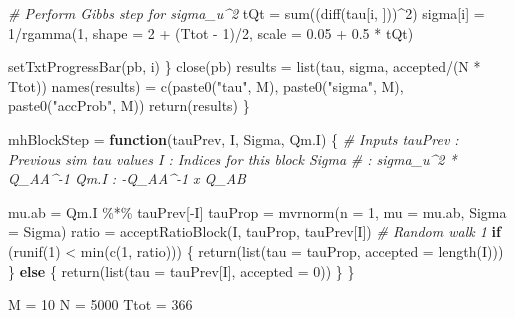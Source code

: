 \documentclass[
]{article}
\newenvironment{Shaded}{\begin{snugshade}}{\end{snugshade}}
\newcommand{\AttributeTok}[1]{\textcolor[rgb]{0.77,0.63,0.00}{#1}}
\newcommand{\CommentTok}[1]{\textcolor[rgb]{0.56,0.35,0.01}{\textit{#1}}}
\newcommand{\ControlFlowTok}[1]{\textcolor[rgb]{0.13,0.29,0.53}{\textbf{#1}}}
\newcommand{\DecValTok}[1]{\textcolor[rgb]{0.00,0.00,0.81}{#1}}
\newcommand{\FloatTok}[1]{\textcolor[rgb]{0.00,0.00,0.81}{#1}}
\newcommand{\FunctionTok}[1]{\textcolor[rgb]{0.00,0.00,0.00}{#1}}
\newcommand{\NormalTok}[1]{#1}
\newcommand{\OtherTok}[1]{\textcolor[rgb]{0.56,0.35,0.01}{#1}}
\newcommand{\SpecialCharTok}[1]{\textcolor[rgb]{0.00,0.00,0.00}{#1}}
\newcommand{\StringTok}[1]{\textcolor[rgb]{0.31,0.60,0.02}{#1}}
\begin{document}
\begin{Shaded}
\begin{Highlighting}[]
        \CommentTok{\# Perform Gibbs step for sigma\_u\^{}2}
\NormalTok{        tQt }\OtherTok{=} \FunctionTok{sum}\NormalTok{((}\FunctionTok{diff}\NormalTok{(tau[i, ]))}\SpecialCharTok{\^{}}\DecValTok{2}\NormalTok{)}
\NormalTok{        sigma[i] }\OtherTok{=} \DecValTok{1}\SpecialCharTok{/}\FunctionTok{rgamma}\NormalTok{(}\DecValTok{1}\NormalTok{, }\AttributeTok{shape =} \DecValTok{2} \SpecialCharTok{+}\NormalTok{ (Ttot }\SpecialCharTok{{-}} \DecValTok{1}\NormalTok{)}\SpecialCharTok{/}\DecValTok{2}\NormalTok{, }\AttributeTok{scale =} \FloatTok{0.05} \SpecialCharTok{+} \FloatTok{0.5} \SpecialCharTok{*}\NormalTok{ tQt)}

        \FunctionTok{setTxtProgressBar}\NormalTok{(pb, i)}
\NormalTok{    \}}
    \FunctionTok{close}\NormalTok{(pb)}
\NormalTok{    results }\OtherTok{=} \FunctionTok{list}\NormalTok{(tau, sigma, accepted}\SpecialCharTok{/}\NormalTok{(N }\SpecialCharTok{*}\NormalTok{ Ttot))}
    \FunctionTok{names}\NormalTok{(results) }\OtherTok{=} \FunctionTok{c}\NormalTok{(}\FunctionTok{paste0}\NormalTok{(}\StringTok{"tau"}\NormalTok{, M), }\FunctionTok{paste0}\NormalTok{(}\StringTok{"sigma"}\NormalTok{, M), }\FunctionTok{paste0}\NormalTok{(}\StringTok{"accProb"}\NormalTok{, M))}
    \FunctionTok{return}\NormalTok{(results)}
\NormalTok{\}}

\NormalTok{mhBlockStep }\OtherTok{=} \ControlFlowTok{function}\NormalTok{(tauPrev, I, Sigma, Qm.I) \{}
    \CommentTok{\# Inputs tauPrev : Previous sim tau values I : Indices for this block Sigma}
    \CommentTok{\# : sigma\_u\^{}2 * Q\_AA\^{}{-}1 Qm.I : {-}Q\_AA\^{}{-}1 x Q\_AB}

\NormalTok{    mu.ab }\OtherTok{=}\NormalTok{ Qm.I }\SpecialCharTok{\%*\%}\NormalTok{ tauPrev[}\SpecialCharTok{{-}}\NormalTok{I]}
\NormalTok{    tauProp }\OtherTok{=} \FunctionTok{mvrnorm}\NormalTok{(}\AttributeTok{n =} \DecValTok{1}\NormalTok{, }\AttributeTok{mu =}\NormalTok{ mu.ab, }\AttributeTok{Sigma =}\NormalTok{ Sigma)}
\NormalTok{    ratio }\OtherTok{=} \FunctionTok{acceptRatioBlock}\NormalTok{(I, tauProp, tauPrev[I])}
    \CommentTok{\# Random walk 1}
    \ControlFlowTok{if}\NormalTok{ (}\FunctionTok{runif}\NormalTok{(}\DecValTok{1}\NormalTok{) }\SpecialCharTok{\textless{}} \FunctionTok{min}\NormalTok{(}\FunctionTok{c}\NormalTok{(}\DecValTok{1}\NormalTok{, ratio))) \{}
        \FunctionTok{return}\NormalTok{(}\FunctionTok{list}\NormalTok{(}\AttributeTok{tau =}\NormalTok{ tauProp, }\AttributeTok{accepted =} \FunctionTok{length}\NormalTok{(I)))}
\NormalTok{    \} }\ControlFlowTok{else}\NormalTok{ \{}
        \FunctionTok{return}\NormalTok{(}\FunctionTok{list}\NormalTok{(}\AttributeTok{tau =}\NormalTok{ tauPrev[I], }\AttributeTok{accepted =} \DecValTok{0}\NormalTok{))}
\NormalTok{    \}}
\NormalTok{\}}

\NormalTok{M }\OtherTok{=} \DecValTok{10}
\NormalTok{N }\OtherTok{=} \DecValTok{5000}
\NormalTok{Ttot }\OtherTok{=} \DecValTok{366}
\end{Highlighting}
\end{Shaded}
\end{document}
